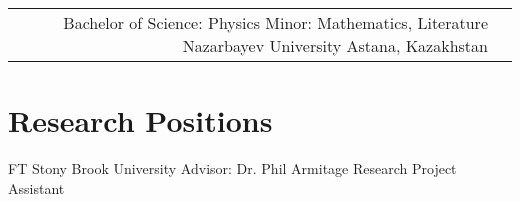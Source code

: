 \documentclass[10pt]{article} %
\begin{document}
\begin{paracol}{1}
\begin{supertabular}{rl}
	
	{Bachelor of Science:} %
	{Physics} %
	{Minor: Mathematics, Literature} %
	{Nazarbayev University} %
	{Astana, Kazakhstan}
	

\end{supertabular}

\section{Research Positions}




{FT} %
{Stony Brook University} %
{Advisor: Dr. Phil Armitage} %
{Research Project Assistant} %






\end{paracol}
\end{document}
